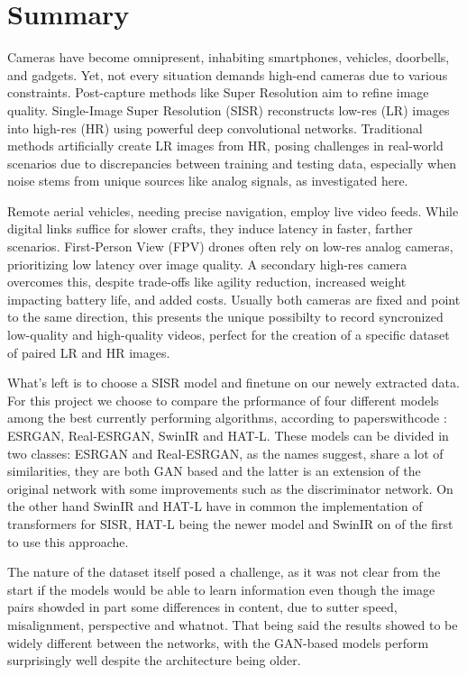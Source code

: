 \chapter*{Summary}
\label{summary}

Cameras have become omnipresent, inhabiting smartphones, vehicles, doorbells, and gadgets. Yet, not every situation demands high-end cameras due to various constraints. Post-capture methods like Super Resolution aim to refine image quality. Single-Image Super Resolution (SISR) reconstructs low-res (LR) images into high-res (HR) using powerful deep convolutional networks. Traditional methods artificially create LR images from HR, posing challenges in real-world scenarios due to discrepancies between training and testing data, especially when noise stems from unique sources like analog signals, as investigated here.

Remote aerial vehicles, needing precise navigation, employ live video feeds. While digital links suffice for slower crafts, they induce latency in faster, farther scenarios. First-Person View (FPV) drones often rely on low-res analog cameras, prioritizing low latency over image quality. A secondary high-res camera overcomes this, despite trade-offs like agility reduction, increased weight impacting battery life, and added costs. Usually both cameras are fixed and point to the same direction, this presents the unique possibilty to record syncronized low-quality and high-quality videos, perfect for the creation of a specific dataset of paired LR and HR images.

What's left is to choose a SISR model and finetune on our newely extracted data. For this project we choose to compare the prformance of four different models among the best currently performing algorithms, according to paperswithcode \cite{pwcode}: ESRGAN\cite{wang2018esrgan}, Real-ESRGAN\cite{wang2021realesrgan}, SwinIR\cite{liang2021swinir} and HAT-L\cite{chen2023activating}. These models can be divided in two classes: ESRGAN and Real-ESRGAN, as the names suggest, share a lot of similarities, they are both GAN based and the latter is an extension of the original network with some improvements such as the discriminator network. On the other hand SwinIR and HAT-L have in common the implementation of transformers for SISR, HAT-L being the newer model and SwinIR on of the first to use this approache.

The nature of the dataset itself posed a challenge, as it was not clear from the start if the models would be able to learn information even though the image pairs showded in part some differences in content, due to sutter speed, misalignment, perspective and whatnot. That being said the results showed to be widely different between the networks, with the GAN-based models perform surprisingly well despite the architecture being older.


